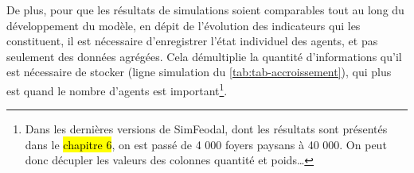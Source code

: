 De plus, pour que les résultats de simulations soient comparables tout au long du développement du modèle, en dépit de l'évolution des indicateurs qui les constituent, il est nécessaire d'enregistrer l'état individuel des agents, et pas seulement des données agrégées.
Cela démultiplie la quantité d'informations qu'il est nécessaire de stocker (ligne \og simulation\fg{} du \cref{tab:tab-accroissement}), qui plus est quand le nombre d'agents est important\footnote{
	Dans les dernières versions de SimFeodal, dont les résultats sont présentés dans le \hl{chapitre 6}, on est passé de 4 000 foyers paysans à 40 000. On peut donc décupler les valeurs des colonnes \og quantité\fg{} et \og poids\fg{}\ldots
}.





